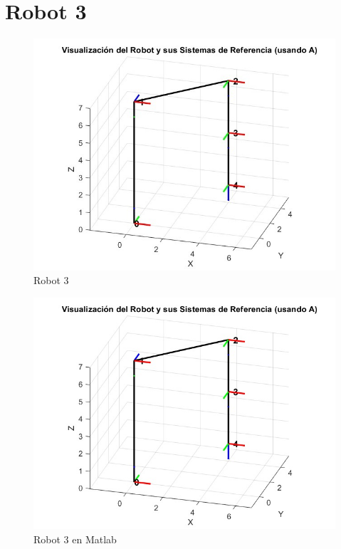 \section{Robot 3}

\begin{figure}
	\centering
	\includegraphics[width=0.5\linewidth]{img/Robot3}
	\caption{Robot 3}
	\label{fig:robot3}
\end{figure}

\begin{figure}
	\centering
	\includegraphics[width=0.7\linewidth]{img/robot_3}
	\caption{Robot 3 en Matlab}
	\label{fig:robot_3}
\end{figure}

